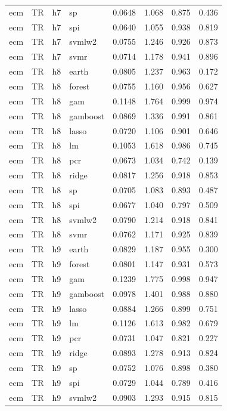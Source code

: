 \begin{ThreePartTable}
\begin{longtable}[t]{llclcccc}
ecm & TR & h7 & sp & 0.0648 & 1.068 & 0.875 & 0.436\\
ecm & TR & h7 & spi & 0.0640 & 1.055 & 0.938 & 0.819\\
ecm & TR & h7 & svmlw2 & 0.0755 & 1.246 & 0.926 & 0.873\\
ecm & TR & h7 & svmr & 0.0714 & 1.178 & 0.941 & 0.896\\
\addlinespace
ecm & TR & h8 & earth & 0.0805 & 1.237 & 0.963 & 0.172\\
ecm & TR & h8 & forest & 0.0755 & 1.160 & 0.956 & 0.627\\
ecm & TR & h8 & gam & 0.1148 & 1.764 & 0.999 & 0.974\\
ecm & TR & h8 & gamboost & 0.0869 & 1.336 & 0.991 & 0.861\\
ecm & TR & h8 & lasso & 0.0720 & 1.106 & 0.901 & 0.646\\
ecm & TR & h8 & lm & 0.1053 & 1.618 & 0.986 & 0.745\\
ecm & TR & h8 & pcr & 0.0673 & 1.034 & 0.742 & 0.139\\
ecm & TR & h8 & ridge & 0.0817 & 1.256 & 0.918 & 0.853\\
ecm & TR & h8 & sp & 0.0705 & 1.083 & 0.893 & 0.487\\
ecm & TR & h8 & spi & 0.0677 & 1.040 & 0.797 & 0.509\\
ecm & TR & h8 & svmlw2 & 0.0790 & 1.214 & 0.918 & 0.841\\
ecm & TR & h8 & svmr & 0.0762 & 1.171 & 0.925 & 0.839\\
\addlinespace
ecm & TR & h9 & earth & 0.0829 & 1.187 & 0.955 & 0.300\\
ecm & TR & h9 & forest & 0.0801 & 1.147 & 0.931 & 0.573\\
ecm & TR & h9 & gam & 0.1239 & 1.775 & 0.998 & 0.947\\
ecm & TR & h9 & gamboost & 0.0978 & 1.401 & 0.988 & 0.880\\
ecm & TR & h9 & lasso & 0.0884 & 1.266 & 0.899 & 0.751\\
ecm & TR & h9 & lm & 0.1126 & 1.613 & 0.982 & 0.679\\
ecm & TR & h9 & pcr & 0.0731 & 1.047 & 0.821 & 0.227\\
ecm & TR & h9 & ridge & 0.0893 & 1.278 & 0.913 & 0.824\\
ecm & TR & h9 & sp & 0.0752 & 1.076 & 0.898 & 0.380\\
ecm & TR & h9 & spi & 0.0729 & 1.044 & 0.789 & 0.416\\
ecm & TR & h9 & svmlw2 & 0.0903 & 1.293 & 0.915 & 0.815\\

\end{longtable}
\end{ThreePartTable}
